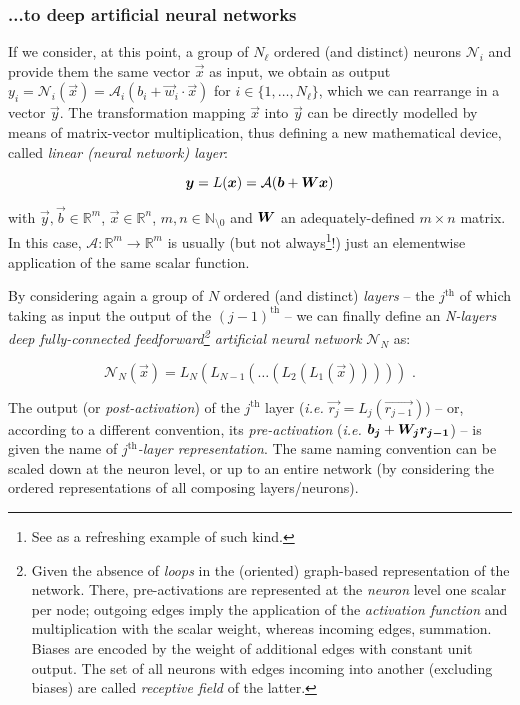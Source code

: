\subsubsection{...to deep artificial neural networks}

If we consider, at this point, a group of $N_{\ell}$ ordered (and distinct) neurons $\mathcal{N}_i$ and provide them the same vector $\vec{x}$ as input, we obtain as output $y_i = \mathcal{N}_i(\vec{x}) = \mathcal{A}_i(b_i + \vec{w}_i \cdot \vec{x})$ for $i \in \{1, \dots, N_{\ell}\}$, which we can rearrange in a vector $\vec{y}$. The transformation mapping $\vec{x}$ into $\vec{y}$ can be directly modelled by means of matrix-vector multiplication, thus defining a new mathematical device, called \textit{linear (neural network) layer}:

$$\bm{y} = L(\bm{x}) = \mathcal{A}(\bm{b} + \bm{W}\bm{x})$$

with $\vec{y}, \vec{b} \in \mathbb{R}^m$, $\vec{x} \in \mathbb{R}^n$, $m,n \in \mathbb{N}_{\setminus0}$ and $\bm{W}$ an adequately-defined $m \times n$ matrix. In this case, $\mathcal{A}: \mathbb{R}^m \rightarrow \mathbb{R}^m$ is usually (but not always\footnote{See \cite{Xiao2020Enhancing} as a refreshing example of such kind.}!) just an elementwise application of the same scalar function.

By considering again a group of $N$ ordered (and distinct) \textit{layers} -- the $j^{\text{th}}$ of which taking as input the output of the $(j-1)^{\text{th}}$ -- we can finally define an \textit{N-layers deep fully-connected feedforward\footnote{\label{graphrepr}Given the absence of \textit{loops} in the (oriented) graph-based representation of the network. There, pre-activations are represented at the \textit{neuron} level one scalar per node; outgoing edges imply the application of the \textit{activation function} and multiplication with the scalar weight, whereas incoming edges, summation. Biases are encoded by the weight of additional edges with constant unit output. The set of all neurons with edges incoming into another (excluding biases) are called \textit{receptive field} of the latter.} artificial neural network} $\mathcal{N}_N$ as:

$$\mathcal{N}_N(\vec{x}) = L_N(L_{N-1}(\dots (L_2(L_1(\vec{x}))))) \text{ .}$$

The output (or \textit{post-activation}) of the $j^{\text{th}}$ layer (\textit{i.e.} $\vec{r_j} = L_j(\vec{r_{j-1}})$) -- or, according to a different convention, its \textit{pre-activation} (\textit{i.e.} $\bm{b_j} + \bm{W_j}\bm{r_{j-1}}$) -- is given the name of \textit{$j^{\text{th}}$-layer representation}. The same naming convention can be scaled down at the neuron level, or up to an entire network (by considering the ordered representations of all composing layers/neurons).

